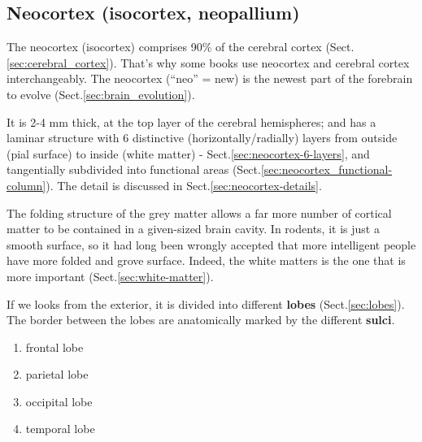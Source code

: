 \subsection{Neocortex (isocortex, neopallium)}
\label{sec:neocortex}


The neocortex (isocortex) comprises 90\% of the cerebral cortex
(Sect.\ref{sec:cerebral_cortex}). That's why some books use neocortex and
cerebral cortex interchangeably.
The neocortex (``neo'' = new) is the newest part of the forebrain
to evolve (Sect.\ref{sec:brain_evolution}).

It is 2-4 mm thick, at the top layer of the cerebral hemispheres; and has a
laminar structure with 6 distinctive (horizontally/radially) layers from outside
(pial surface) to inside (white matter) - Sect.\ref{sec:neocortex-6-layers}, and
tangentially subdivided into functional areas
(Sect.\ref{sec:neocortex_functional-column}). The detail is discussed in
Sect.\ref{sec:neocortex-details}.




\begin{mdframed}

The folding structure of the grey matter allows a far more number of cortical
matter to be contained in a given-sized brain cavity.
In rodents, it is just a smooth surface, so it had long been wrongly accepted
that more intelligent people have more folded and grove surface. Indeed, the
white matters is the one that is more important (Sect.\ref{sec:white-matter}).

\end{mdframed}


If we looks from the exterior, it is divided into different {\bf lobes}
(Sect.\ref{sec:lobes}). The border between the lobes are anatomically marked by
the different {\bf sulci}.
\begin{enumerate}
  \item frontal lobe
  \item parietal lobe
  \item occipital lobe
  \item temporal lobe
\end{enumerate}


